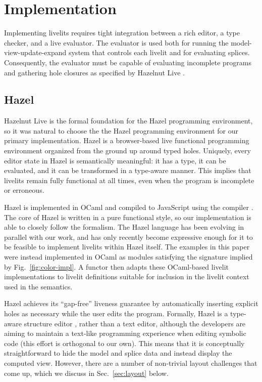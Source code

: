 \section{Implementation}\label{sec:implementation}
Implementing livelits requires tight integration between a rich editor, 
a type checker, and a live evaluator. The evaluator is used
both for running the model-view-update-expand system that controls 
each livelit and for evaluating splices. Consequently, 
the evaluator must be capable of evaluating incomplete programs and gathering hole closures
as specified by Hazelnut Live \cite{HazelnutLive}.

\subsection{Hazel}
Hazelnut Live is the formal foundation for the Hazel programming environment, so 
it was natural to choose the the Hazel programming environment for our primary implementation. 
 Hazel is a browser-based live functional programming environment 
organized from the ground up around typed holes. Uniquely, every editor state in Hazel is 
semantically meaningful: it has a type, it can be evaluated, and it can be transformed 
in a type-aware manner. This implies that livelits remain fully functional at all times, 
even when the program is incomplete or erroneous.

Hazel is implemented in OCaml and compiled to JavaScript using the  compiler \cite{DBLP:conf/aplas/RadanneVB16}.
The core of Hazel is written in a pure functional style, so our implementation is able to closely 
follow the formalism. The Hazel language has been evolving in parallel with our work, 
and has only recently become expressive enough for it to be feasible to implement livelits within Hazel itself.
The examples in this paper were instead implemented in OCaml as modules satisfying the signature 
implied by Fig.~\ref{fig:color-impl}. A functor then adapts these OCaml-based livelit implementations 
to livelit definitions suitable for inclusion in the livelit context used in the semantics.

Hazel achieves its ``gap-free'' liveness guarantee by automatically inserting explicit holes as necessary 
while the user edits 
the program. Formally, Hazel is a type-aware structure editor \cite{Hazelnut}, rather than a text editor, 
although the developers are aiming to maintain a text-like programming experience when editing 
symbolic code (this effort is orthogonal to our own). 
This means that it is conceptually straightforward to hide the model and splice data and instead display 
the computed view. However, there are a number of non-trivial layout challenges that come up, which we discuss
in Sec.~\ref{sec:layout} below.

